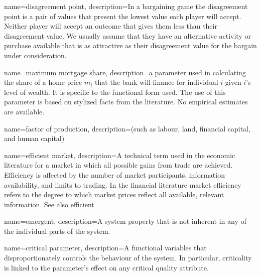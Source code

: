 {
name=disagreement point,
description={In a bargaining game the disagreement point is a pair of values that present the lowest value each player will accept. Neither player will accept an outcome that gives them less than their disagreement value. We usually assume that they have an alternative activity or purchase available that is as attractive as their disagreement value for the bargain under consideration.}
}


{
name=maximum mortgage share,
description={a parameter used in calculating the share of a home price $m_i$ that the bank will finance for individual $i$ given $i$'s level of wealth. It is specific to the functional form used. The use of this parameter is based on stylized facts from the literature.  No empirical estimates are available.}
}

{
name=factor of production,
description={(such as labour, land, financial capital,  and human capital)}
}


{
name=efficient market,
description={A technical term used in the economic literature for a market in which all possible gains from trade are achieved. Efficiency is affected by the number of market participants, information availability, and limits to trading. In the financial literature market efficiency refers to the degree to which market prices reflect all available, relevant information. See also \gls{efficient}} %
}



{
name=emergent,
description={A system property that is not inherent in any of the individual parts of the system. %
}
}

{
name=critical parameter,
description={A functional variables that disproportionately controls the behaviour of the system. In particular, criticality is linked to the parameter's effect on any critical quality attribute. %
}
}

